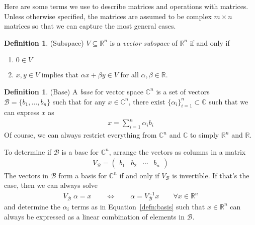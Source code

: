 \documentclass[12pt]{article}
\numberwithin{equation}{section} %
\theoremstyle{plain}
\theoremstyle{definition}
\newtheorem{defn}[thm]{Definition}
\theoremstyle{remark}
\newcommand{\R}{\mathbb{R}}
\newcommand{\Rn}{\mathbb{R}^n}
\newcommand{\C}{\mathbb{C}}
\newcommand{\Cn}{\mathbb{C}^n}
\begin{document}
Here are some terms we use to describe matrices and operations with
matrices. Unless otherwise specified, the matrices are assumed to be
complex $m\times n$ matrices so that we can capture the most general
cases.

\begin{defn}{(Subspace)}
$V\subseteq \Rn$ is a \emph{vector subspace} of $\Rn$ if and only if
\begin{enumerate}
  \item $0 \in V$
  \item $x,y\in V$ implies that $\alpha x + \beta y \in V$ for all
    $\alpha,\beta\in \R$.
\end{enumerate}
\end{defn}

\begin{defn}{(Base)}
A \emph{base} for vector space $\Cn$ is a set of vectors
$\mathcal{B}=\{b_1,\ldots,b_n\}$ such that for any $x\in \Cn$, there
exist $\{\alpha_i\}_{i=1}^n \subset \C$ such that we can express $x$ as
\begin{align}
  x = \sum^n_{i=1} \alpha_i b_i
  \label{defn:basis}
\end{align}
Of course, we can always restrict everything from $\Cn$ and $\C$ to
simply $\Rn$ and $\R$.

To determine if $\mathcal{B}$ is a base for $\Cn$, arrange the vectors
as columns in a matrix
\begin{align*}
  V_\mathcal{B} = \begin{pmatrix} b_1 & b_2 &\cdots & b_n \end{pmatrix}
\end{align*}
The vectors in $\mathcal{B}$ form a basis for $\Cn$ if and only if
$V_\mathcal{B}$ is invertible. If that's the case, then we can always
solve
\begin{align*}
  V_\mathcal{B} \;\alpha = x
  \qquad\Leftrightarrow\qquad
  \alpha = V_\mathcal{B}^{-1} x
  \qquad \forall x\in \Rn
\end{align*}
and determine the $\alpha_i$ terms as in Equation~\ref{defn:basis} such
that $x \in \Rn$ can always be expressed as a linear combination of
elements in $\mathcal{B}$.
\end{defn}
\end{document}
